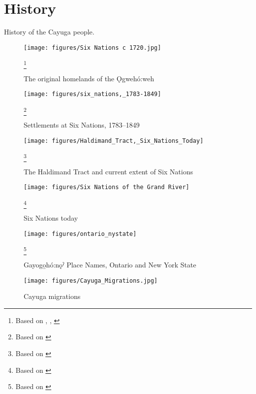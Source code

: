 

\chapter{History}

History of the Cayuga people.

\begin{figure}[ht]
\texttt{[image: figures/Six Nations c 1720.jpg]}
\caption{The original homelands of the Ǫgwehó:weh}\footnote{Based on \cite{morgan_lewis_henry_map_1720}, \cite{gisgeography_new_2013}, \cite{nonenmacher_iroquois_2004}}
\label{map:original.home}
\end{figure}

\lipsum[1]

\begin{figure}[ht]
\texttt{[image: figures/six\_nations,\_1783-1849]}
\caption{Settlements at Six Nations, 1783--1849}\footnote{Based on \cite[18--19]{beaver_mohawk_1997}}
\label{map:settlements.at.Six}
\end{figure}

\lipsum[1]

\begin{figure}[ht]
\texttt{[image: figures/Haldimand\_Tract,\_Six\_Nations\_Today]}
\caption{The Haldimand Tract and current extent of Six Nations}\footnote{Based on \cite{six_nations_lands_and_resources_haldimand_2008}}
\label{map:Haldimand.and.today}
\end{figure}

\lipsum[1]

\begin{figure}[ht]
\texttt{[image: figures/Six Nations of the Grand River]}
\caption{Six Nations today}\footnote{Based on \cite[xiv]{froman_english-cayugacayuga-english_2002}}
\label{map:6nations.today}
\end{figure}

\lipsum[1]

\begin{figure}[ht]
\texttt{[image: figures/ontario\_nystate]}
\caption{Gayogo̱hó:nǫˀ Place Names, Ontario and New York State}\footnote{Based on \cite{mithun_wadewayestanih_1984}}
\label{map:place.names}
\end{figure}

\begin{figure}[ht]
\texttt{[image: figures/Cayuga\_Migrations.jpg]}
\caption{Cayuga migrations}
\label{map:Cayuga.migrations}
\end{figure}

